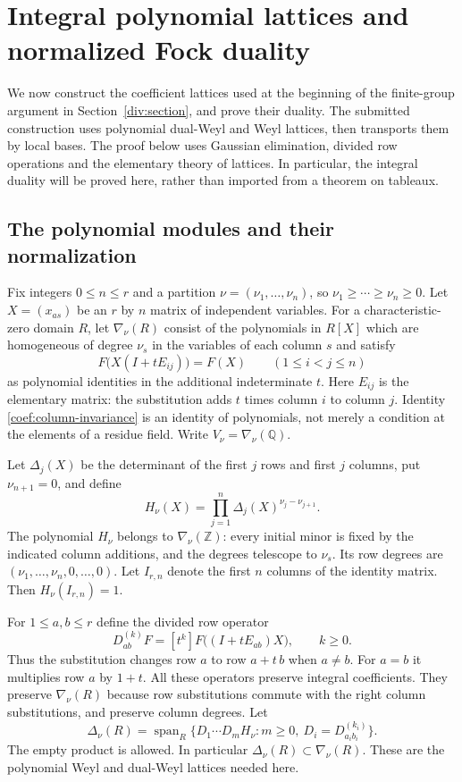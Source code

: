 \section{Integral polynomial lattices and normalized Fock duality}
\label{coef:section}

We now construct the coefficient lattices used at the beginning of the
finite-group argument in Section~\ref{div:section}, and prove their
duality. The submitted construction uses polynomial dual-Weyl and Weyl
lattices, then transports them by local bases.\cite{alpo-uniform-source}
The proof below uses Gaussian elimination, divided row operations and
the elementary theory of lattices. In particular, the integral duality
will be proved here, rather than imported from a theorem on tableaux.

\subsection{The polynomial modules and their normalization}

Fix integers $0\le n\le r$ and a partition
$\nu=(\nu_1,\ldots,\nu_n)$, so
$\nu_1\ge\cdots\ge\nu_n\ge0$. Let $X=(x_{as})$ be an $r$ by $n$
matrix of independent variables. For a characteristic-zero domain $R$,
let $\nabla_\nu(R)$ consist of the polynomials in $R[X]$ which are
homogeneous of degree $\nu_s$ in the variables of each column $s$ and satisfy
\begin{equation}\label{coef:column-invariance}
 F\bigl(X(I+tE_{ij})\bigr)=F(X)\qquad(1\le i<j\le n)
\end{equation}
as polynomial identities in the additional indeterminate $t$.
Here $E_{ij}$ is the elementary matrix: the substitution adds $t$ times
column $i$ to column $j$. Identity \eqref{coef:column-invariance} is an
identity of polynomials, not merely a condition at the elements of a
residue field. Write $V_\nu=\nabla_\nu(\mathbb Q)$.

Let $\Delta_j(X)$ be the determinant of the first $j$ rows and first
$j$ columns, put $\nu_{n+1}=0$, and define
\[
 H_\nu(X)=\prod_{j=1}^n\Delta_j(X)^{\nu_j-\nu_{j+1}}.
\]
The polynomial $H_\nu$ belongs to $\nabla_\nu(\mathbb Z)$: every
initial minor is fixed by the indicated column additions, and the
degrees telescope to $\nu_s$. Its row degrees are
$(\nu_1,\ldots,\nu_n,0,\ldots,0)$.
Let $I_{r,n}$ denote the first $n$ columns of the identity matrix.
Then $H_\nu(I_{r,n})=1$.

For $1\le a,b\le r$ define the divided row operator
\[
 D_{ab}^{(k)}F=[t^k]F\bigl((I+tE_{ab})X\bigr),\qquad k\ge0.
\]
Thus the substitution changes row $a$ to row $a+t\,b$ when $a\ne b$.
For $a=b$ it multiplies row $a$ by $1+t$.
All these operators preserve integral coefficients. They preserve
$\nabla_\nu(R)$ because row substitutions commute with the right
column substitutions, and preserve column degrees. Let
\[
 \Delta_\nu(R)=\operatorname{span}_R
 \{D_1\cdots D_mH_\nu:m\ge0,\ D_i=D_{a_i b_i}^{(k_i)}\}.
\]
The empty product is allowed. In particular
$\Delta_\nu(R)\subset\nabla_\nu(R)$.
These are the polynomial Weyl and dual-Weyl lattices needed here.

